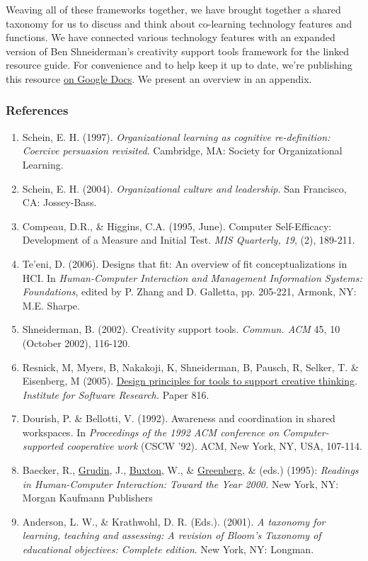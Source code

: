 Weaving all of these frameworks together, we have brought together a
shared taxonomy for us to discuss and think about co-learning technology
features and functions. We have connected various technology features
with an expanded version of Ben Shneiderman's creativity support tools
framework for the linked resource guide. For convenience and to help
keep it up to date, we're publishing this resource
\href{http://goo.gl/H02fMA}{on Google Docs}. We present an overview
in an appendix.

\subsubsection{References}

\begin{enumerate}
\item
  Schein, E. H. (1997). \emph{Organizational learning as cognitive
  re-definition: Coercive persuasion revisited}. Cambridge, MA: Society
  for Organizational Learning.
\item
  Schein, E. H. (2004). \emph{Organizational culture and leadership.}
  San Francisco, CA: Jossey-Bass.
\item
  Compeau, D.R., \& Higgins, C.A. (1995, June). Computer Self-Efficacy:
  Development of a Measure and Initial Test. \emph{MIS Quarterly, 19},
  (2), 189-211.
\item
  Te'eni, D. (2006). Designs that fit: An overview of fit
  conceptualizations in HCI. In \emph{Human-Computer Interaction and
  Management Information Systems: Foundations}, edited by P. Zhang and
  D. Galletta, pp. 205-221, Armonk, NY: M.E. Sharpe.
\item
  Shneiderman, B. (2002). Creativity support tools. \emph{Commun. ACM}
  45, 10 (October 2002), 116-120.
\item
  Resnick, M, Myers, B, Nakakoji, K, Shneiderman, B, Pausch, R, Selker,
  T. \& Eisenberg, M (2005).
  \href{http://repository.cmu.edu/isr/816}{Design principles for tools
  to support creative thinking}. \emph{Institute for Software Research.}
  Paper 816.
\item
  Dourish, P. \& Bellotti, V. (1992). Awareness and coordination in
  shared workspaces. In \emph{Proceedings of the 1992 ACM conference on
  Computer-supported cooperative work} (CSCW '92). ACM, New York, NY,
  USA, 107-114.
\item
  Baecker, R.,
  \href{http://www.interaction-design.org/references/authors/jonathan\_grudin.html}{Grudin},
  J.,
  \href{http://www.interaction-design.org/references/authors/william\_buxton.html}{Buxton},
  W., \&
  \href{http://www.interaction-design.org/references/authors/saul\_greenberg.html}{Greenberg},
  \& (eds.) (1995): \emph{Readings in Human-Computer Interaction: Toward
  the Year 2000.} New York, NY: Morgan Kaufmann Publishers
\item
  Anderson, L. W., \& Krathwohl, D. R. (Eds.). (2001). \emph{A taxonomy
  for learning, teaching and assessing: A revision of Bloom's Taxonomy
  of educational objectives: Complete edition}. New York, NY: Longman.
\end{enumerate}

